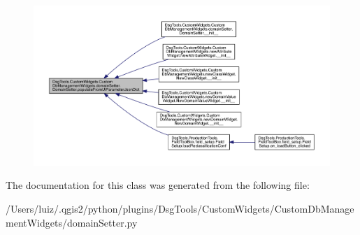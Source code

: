 \begin{figure}[H]
\begin{center}
\leavevmode
\includegraphics[width=350pt]{class_dsg_tools_1_1_custom_widgets_1_1_custom_db_management_widgets_1_1domain_setter_1_1_domain_setter_a078ff64c27028700336dd5ff9c5d0f25_icgraph}
\end{center}
\end{figure}


The documentation for this class was generated from the following file\+:\begin{DoxyCompactItemize}
\item 
/\+Users/luiz/.\+qgis2/python/plugins/\+Dsg\+Tools/\+Custom\+Widgets/\+Custom\+Db\+Management\+Widgets/domain\+Setter.\+py\end{DoxyCompactItemize}
